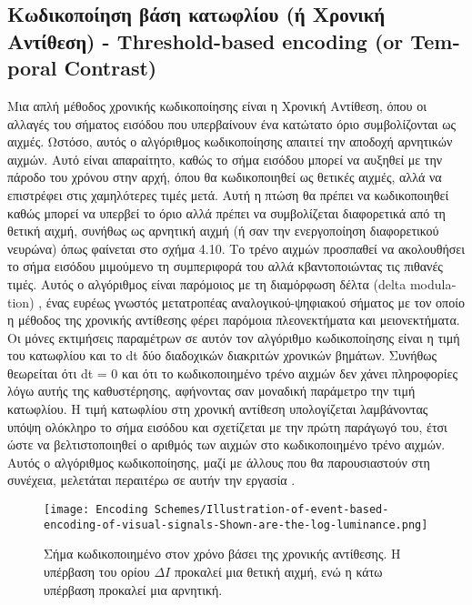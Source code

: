 \documentclass[12pt]{report}
\begin{document}
\subsection{Κωδικοποίηση βάση κατωφλίου (ή Χρονική Αντίθεση) - \textlatin{Threshold-based encoding (or Temporal Contrast)}}

Μια απλή μέθοδος χρονικής κωδικοποίησης είναι η Χρονική Αντίθεση, όπου οι αλλαγές του σήματος εισόδου που υπερβαίνουν ένα κατώτατο όριο συμβολίζονται ως αιχμές. Ωστόσο, αυτός ο αλγόριθμος κωδικοποίησης απαιτεί την αποδοχή αρνητικών αιχμών. Αυτό είναι απαραίτητο, καθώς το σήμα εισόδου μπορεί να αυξηθεί με την πάροδο του χρόνου στην αρχή, όπου θα κωδικοποιηθεί ως θετικές αιχμές, αλλά να επιστρέφει στις χαμηλότερες τιμές μετά. Αυτή η πτώση θα πρέπει να κωδικοποιηθεί καθώς μπορεί να υπερβεί το όριο αλλά πρέπει να συμβολίζεται διαφορετικά από τη θετική αιχμή, συνήθως ως αρνητική αιχμή (ή σαν την ενεργοποίηση διαφορετικού νευρώνα) όπως φαίνεται στο σχήμα 4.10. Το τρένο αιχμών προσπαθεί να ακολουθήσει το σήμα εισόδου μιμούμενο τη συμπεριφορά του αλλά κβαντοποιώντας τις πιθανές τιμές. Αυτός ο αλγόριθμος είναι παρόμοιος με τη διαμόρφωση δέλτα (\textlatin{delta modulation}) \cite{Schindler1970}, ένας ευρέως γνωστός μετατροπέας αναλογικού-ψηφιακού σήματος με τον οποίο η μέθοδος της χρονικής αντίθεσης φέρει παρόμοια πλεονεκτήματα και μειονεκτήματα. Οι μόνες εκτιμήσεις παραμέτρων σε αυτόν τον αλγόριθμο κωδικοποίησης είναι η τιμή του κατωφλίου και το \textlatin{dt} δύο διαδοχικών διακριτών χρονικών βημάτων. Συνήθως θεωρείται ότι \textlatin{dt} = 0 και ότι το κωδικοποιημένο τρένο αιχμών δεν χάνει πληροφορίες λόγω αυτής της καθυστέρησης, αφήνοντας σαν μοναδική παράμετρο την τιμή κατωφλίου. Η τιμή κατωφλίου στη χρονική αντίθεση υπολογίζεται λαμβάνοντας υπόψη ολόκληρο το σήμα εισόδου και σχετίζεται με την πρώτη παράγωγό του, έτσι ώστε να βελτιστοποιηθεί ο αριθμός των αιχμών στο κωδικοποιημένο τρένο αιχμών. Αυτός ο αλγόριθμος κωδικοποίησης, μαζί με άλλους που θα παρουσιαστούν στη συνέχεια, μελετάται περαιτέρω σε αυτήν την εργασία \cite{Petro2020}.

\begin{figure}[htp]
    \centering
    \texttt{[image: Encoding Schemes/Illustration-of-event-based-encoding-of-visual-signals-Shown-are-the-log-luminance.png]}
    \caption{Σήμα κωδικοποιημένο στον χρόνο βάσει της χρονικής αντίθεσης. Η υπέρβαση του ορίου \(\Delta I\) προκαλεί μια θετική αιχμή, ενώ η κάτω υπέρβαση προκαλεί μια αρνητική.}
    \label{fig:spikeprop-net-architecture}
\end{figure}
\end{document}
